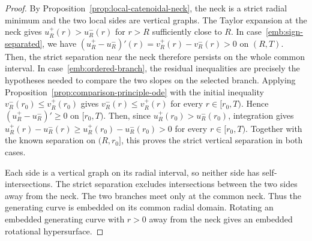 \documentclass{amsart}
\theoremstyle{plain}
\theoremstyle{mainintrothm}
\theoremstyle{definition}
\begin{document}
\begin{proof}
	By Proposition~\ref{prop:local-catenoidal-neck}, the neck is a strict radial
	minimum and the two local sides are vertical graphs.  The Taylor expansion at
	the neck gives $u_R^+(r)>u_R^-(r)$ for $r>R$ sufficiently close to $R$. In case~\ref{emb:sign-separated}, we have $(u_R^+-u_R^-)'(r)=v_R^+(r)-v_R^-(r)>0$ on $(R,T)$. Then, the strict separation near the neck therefore persists on the whole common interval. In case~\ref{emb:ordered-branch}, the residual inequalities are precisely the
	hypotheses needed to compare the two slopes on the selected branch.  Applying
	Proposition~\ref{prop:comparison-principle-ode} with the initial inequality
	$v_R^-(r_0)\le v_R^+(r_0)$ gives $v_R^-(r)\le v_R^+(r)$ for every $r\in[r_0,T)$.
	Hence $(u_R^+-u_R^-)'\ge0$ on $[r_0,T)$.  Then, since $u_R^+(r_0)>u_R^-(r_0)$, integration gives $u_R^+(r)-u_R^-(r)\ge u_R^+(r_0)-u_R^-(r_0)>0$ for every $r\in[r_0,T)$. Together with the known separation on $(R,r_0]$, this proves the strict vertical separation in both cases.
	
	\medskip
	
	Each side is a vertical graph on its radial interval, so neither side has
	self-intersections.  The strict separation excludes intersections between the
	two sides away from the neck.  The two branches meet only at the common neck.
	Thus the generating curve is embedded on its common radial domain.  Rotating
	an embedded generating curve with $r>0$ away from the neck gives an embedded
	rotational hypersurface.

	
\end{proof}
\end{document}
